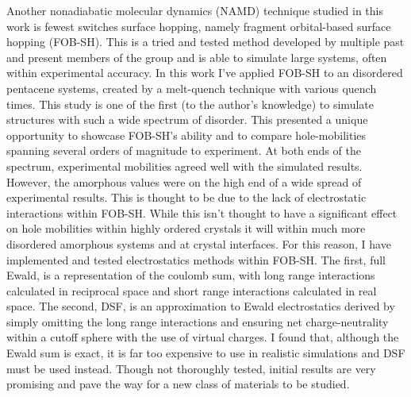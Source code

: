 Another nonadiabatic molecular dynamics (NAMD) technique studied in this work is fewest switches surface hopping, namely fragment orbital-based surface hopping (FOB-SH). This is a tried and tested method developed by multiple past and present members of the group and is able to simulate large systems, often within experimental accuracy. In this work I've applied FOB-SH to an disordered pentacene systems, created by a melt-quench technique with various quench times. This study is one of the first (to the author's knowledge) to simulate structures with such a wide spectrum of disorder. This presented a unique opportunity to showcase FOB-SH's ability and to compare hole-mobilities spanning several orders of magnitude to experiment. At both ends of the spectrum, experimental mobilities agreed well with the simulated results. However, the amorphous values were on the high end of a wide spread of experimental results. This is thought to be due to the lack of electrostatic interactions within FOB-SH. While this isn't thought to have a significant effect on hole mobilities within highly ordered crystals it will within much more disordered amorphous systems and at crystal interfaces. For this reason, I have implemented and tested  electrostatics methods within FOB-SH. The first, full Ewald, is a representation of the coulomb sum, with long range interactions calculated in reciprocal space and short range interactions calculated in real space. The second, DSF, is an approximation to Ewald electrostatics derived by simply omitting the long range interactions and ensuring net charge-neutrality within a cutoff sphere with the use of virtual charges. I found that, although the Ewald sum is exact, it is far too expensive to use in realistic simulations and DSF must be used instead. Though\mremove{,} not thoroughly tested, initial results are very promising and pave the way for a new class of materials to be studied.
